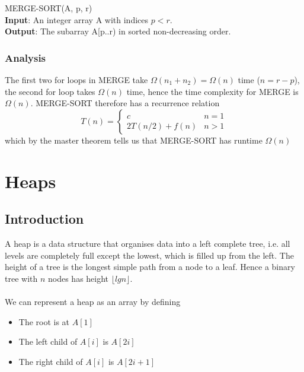 \documentclass{article}
\begin{document}
            MERGE-SORT(A, p, r) \\
            \textbf{Input}: An integer array A with indices $p < r$. \\
            \textbf{Output}: The subarray A[p..r) in sorted non-decreasing order.
            \begin{algorithmic}[1]
                \EndIf
            \end{algorithmic}
        \subsubsection{Analysis}
            The first two for loops in MERGE take $\Omega(n_1 + n_2) = \Omega(n)$ time ($n = r - p$), the second for loop takes $\Omega(n)$ time, hence the time complexity for MERGE is $\Omega(n)$. MERGE-SORT therefore has a recurrence relation
            \[ 
                T(n) = 
                \begin{cases} 
                    c & n = 1 \\
                    2T(n/2) + f(n) & n > 1 
                \end{cases}
            \]
            which by the master theorem tells us that MERGE-SORT has runtime $\Omega(n)$
            

\section{Heaps}
    \subsection{Introduction}
        A heap is a data structure that organises data into a left complete tree, i.e. all levels are completely full except the lowest, which is filled up from the left. The height of a tree is the longest simple path from a node to a leaf. Hence a binary tree with $n$ nodes has height $\lfloor lg n \rfloor$. \\ \\
        We can represent a heap as an array by defining

        \begin{itemize}
            \item The root is at $A[1]$
            \item The left child of $A[i]$ is $A[2i]$
            \item The right child of $A[i]$ is $A[2i + 1]$
        \end{itemize}
        
\end{document}
